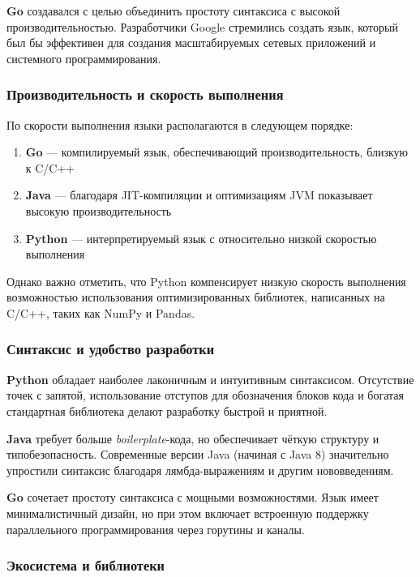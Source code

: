 \textbf{Go} создавался с целью объединить простоту синтаксиса с высокой производительностью\cite{donovan2015go}. Разработчики Google стремились создать язык, который был бы эффективен для создания масштабируемых сетевых приложений и системного программирования.

\subsubsection*{Производительность и скорость выполнения}

По скорости выполнения языки располагаются в следующем порядке:

\begin{enumerate}
    \item \textbf{Go} --- компилируемый язык, обеспечивающий производительность, близкую к C/C++
    \item \textbf{Java} --- благодаря JIT-компиляции и оптимизациям JVM показывает высокую производительность
    \item \textbf{Python} --- интерпретируемый язык с относительно низкой скоростью выполнения
\end{enumerate}

Однако важно отметить, что Python компенсирует низкую скорость выполнения возможностью использования оптимизированных библиотек, написанных на C/C++, таких как NumPy и Pandas.

\subsubsection*{Синтаксис и удобство разработки}

\textbf{Python} обладает наиболее лаконичным и интуитивным синтаксисом. Отсутствие точек с запятой, использование отступов для обозначения блоков кода и богатая стандартная библиотека делают разработку быстрой и приятной.

\textbf{Java} требует больше \textit{boilerplate}-кода, но обеспечивает чёткую структуру и типобезопасность. Современные версии Java (начиная с Java 8) значительно упростили синтаксис благодаря лямбда-выражениям и другим нововведениям.

\textbf{Go} сочетает простоту синтаксиса с мощными возможностями. Язык имеет минималистичный дизайн, но при этом включает встроенную поддержку параллельного программирования через горутины и каналы.

\subsubsection*{Экосистема и библиотеки}

